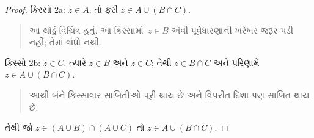 \documentclass[../../../include/open-logic-section]{subfiles}
\begin{document}
\begin{proof}
કિસ્સો 2a: $z \in A$. તો ફરી $z \in A \cup (B \cap C)$.
\begin{quote}
આ થોડું વિચિત્ર હતું. આ કિસ્સામાં~$z \in B$ એવી
પૂર્વધારણાની ખરેખર જરૂર પડી નહીં; તેમાં વાંધો નથી.
\end{quote}
કિસ્સો 2b: $z \in C$. ત્યારે $z \in B$ અને $z \in C$;
તેથી $z \in B \cap C$ અને પરિણામે $z \in A \cup (B \cap C)$.
\begin{quote}
આથી બંને કિસ્સાવાર સાબિતીઓ પૂરી થાય છે અને વિપરીત દિશા
પણ સાબિત થાય છે.
\end{quote}
તેથી જો $z \in (A \cup B) \cap (A \cup C)$ તો $z \in A \cup (B \cap C)$.
\end{proof}
\end{document}
